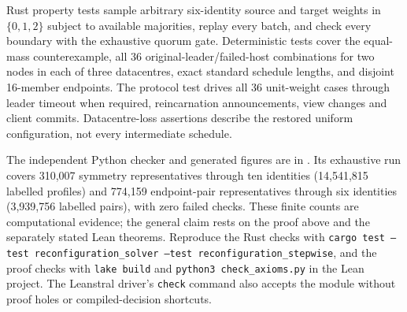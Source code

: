 \documentclass[10pt,journal,letterpaper]{IEEEtran}
\newcommand{\code}[1]{\texttt{#1}}
\begin{document}
Rust property tests sample arbitrary six-identity source and target weights in $\{0,1,2\}$ subject to available majorities, replay every batch, and check every boundary with the exhaustive quorum gate. Deterministic tests cover the equal-mass counterexample, all 36 original-leader/failed-host combinations for two nodes in each of three datacentres, exact standard schedule lengths, and disjoint 16-member endpoints. The protocol test drives all 36 unit-weight cases through leader timeout when required, reincarnation announcements, view changes and client commits. Datacentre-loss assertions describe the restored uniform configuration, not every intermediate schedule.

The independent Python checker and generated figures are in . Its exhaustive run covers 310,007 symmetry representatives through ten identities (14,541,815 labelled profiles) and 774,159 endpoint-pair representatives through six identities (3,939,756 labelled pairs), with zero failed checks. These finite counts are computational evidence; the general claim rests on the proof above and the separately stated Lean theorems. Reproduce the Rust checks with \code{cargo test --test reconfiguration\_solver --test reconfiguration\_stepwise}, and the proof checks with \code{lake build} and \code{python3 check\_axioms.py} in the Lean project. The Leanstral driver's \code{check} command also accepts the module without proof holes or compiled-decision shortcuts.
\end{document}

